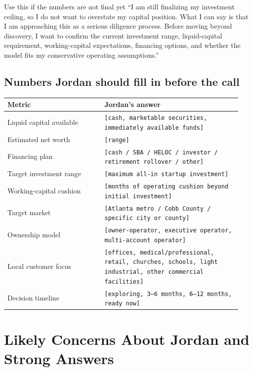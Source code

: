 \documentclass[11pt]{article}
\newcommand{\placeholder}[1]{\textcolor{accent}{\texttt{[#1]}}}
\begin{document}
\begin{scriptbox}{Use this if the numbers are not final yet}
``I am still finalizing my investment ceiling, so I do not want to overstate my capital position. What I can say is that I am approaching this as a serious diligence process. Before moving beyond discovery, I want to confirm the current investment range, liquid-capital requirement, working-capital expectations, financing options, and whether the model fits my conservative operating assumptions.''
\end{scriptbox}

\subsection{Numbers Jordan should fill in before the call}

\begin{longtable}{>{\raggedright\arraybackslash}p{0.39\linewidth}>{\raggedright\arraybackslash}p{0.55\linewidth}}
\toprule
\textbf{Metric} & \textbf{Jordan's answer} \\
\midrule
Liquid capital available & \placeholder{cash, marketable securities, immediately available funds} \\
Estimated net worth & \placeholder{range} \\
Financing plan & \placeholder{cash / SBA / HELOC / investor / retirement rollover / other} \\
Target investment range & \placeholder{maximum all-in startup investment} \\
Working-capital cushion & \placeholder{months of operating cushion beyond initial investment} \\
Target market & \placeholder{Atlanta metro / Cobb County / specific city or county} \\
Ownership model & \placeholder{owner-operator, executive operator, multi-account operator} \\
Local customer focus & \placeholder{offices, medical/professional, retail, churches, schools, light industrial, other commercial facilities} \\
Decision timeline & \placeholder{exploring, 3--6 months, 6--12 months, ready now} \\
\bottomrule
\end{longtable}

\section{Likely Concerns About Jordan and Strong Answers}
\end{document}

